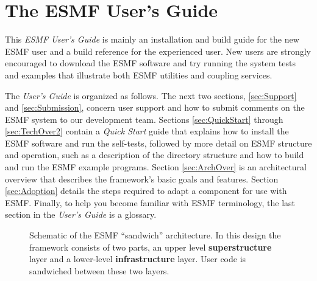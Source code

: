 
\section{The ESMF User's Guide}

This {\it ESMF User's Guide} is mainly an installation and build guide for
the new ESMF user and a build reference for the experienced user.  
New users are strongly encouraged to download the ESMF software and try
running the system tests and examples that illustrate both ESMF utilities and
coupling services.  

The {\it User's Guide} is organized as follows.  The next two sections, 
\ref{sec:Support} and \ref{sec:Submission}, 
concern user support and how to submit comments on the ESMF system 
to our development team.  
Sections \ref{sec:QuickStart} through \ref{sec:TechOver2} contain a 
{\it Quick Start} guide that explains how to install the ESMF software 
and run the self-tests, 
followed by more detail on ESMF structure and operation, 
such as a description of the directory structure and how to build and
run the ESMF example programs.
Section \ref{sec:ArchOver} is an architectural overview that describes the
framework's basic goals and features.  
Section \ref{sec:Adoption} details the steps required to adapt a component
for use with ESMF.  Finally, to help you become familiar with ESMF
terminology, the last section in the {\it User's Guide} is a glossary.

\begin{center}
\begin{figure}
\caption{Schematic of the ESMF ``sandwich'' architecture. In this 
design the framework consists of two parts, an upper level
{\bf superstructure} layer and a lower-level {\bf infrastructure} layer. 
User code is sandwiched between these two layers.}
\label{fig:TheESMFwich}
\end{figure}
\end{center}


